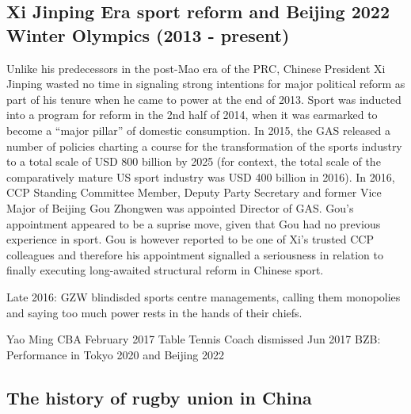 {\subsection{Xi Jinping Era sport reform and Beijing 2022 Winter Olympics (2013 - present)}

Unlike his predecessors in the post-Mao era of the PRC, Chinese President Xi Jinping wasted no time in signaling strong intentions for major political reform as part of his tenure when he came to power at the end of 2013.  Sport was inducted into a program for reform in the 2nd half of 2014, when it was earmarked to become a ``major pillar'' of domestic consumption. In 2015, the GAS released a number of policies charting a course for the transformation of the sports industry to a total scale of USD 800 billion by 2025 (for context, the total scale of the comparatively mature US sport industry was USD 400 billion in 2016).  In 2016, CCP Standing Committee Member, Deputy Party Secretary and former Vice Major of Beijing Gou Zhongwen was appointed Director of GAS.  Gou's appointment appeared to be a suprise move, given that Gou had no previous experience in sport. Gou is however reported to be one of Xi's trusted CCP colleagues and therefore his appointment signalled a seriousness in relation to finally executing long-awaited structural reform in Chinese sport.

Late 2016:  GZW blindisded sports centre managements, calling them monopolies and saying too much power rests in the hands of their chiefs.

  Yao Ming CBA February 2017
  Table Tennis Coach dismissed Jun 2017
  BZB: Performance in Tokyo 2020 and Beijing 2022




  \subsection{The history of rugby union in China}





}
